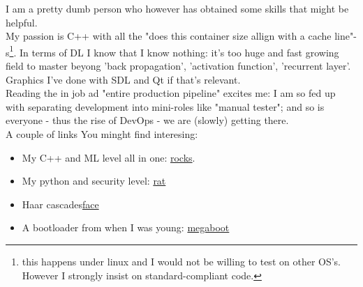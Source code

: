 \documentclass{article}
\begin{document}
I am a pretty dumb person who however has obtained some skills that might be helpful.  \\

My passion is C++ with all the "does this container size allign with a cache line"-s\footnote{this happens under linux and I would not be willing to test on other OS's. However I strongly insist on standard-compliant code.}.
In terms of DL I know that I know nothing: it's too huge and fast growing field to master beyong 'back propagation', 'activation function', 'recurrent layer'.
Graphics I've done with SDL and Qt if that's relevant.  \\

Reading the in job ad "entire production pipeline" excites me: I am so fed up with separating development into mini-roles like "manual tester"; and so is everyone - thus the rise of DevOps - we are (slowly) getting there.  \\

A couple of links You minght find interesing:  \\
\begin{itemize}
\item{My C++ and ML level all in one: {\href{https://github.com/MiroslavVitkov/rocks}{rocks}}.}
\item{My python and security level: {\href{https://github.com/MiroslavVitkov/rat}{rat}}}
\item{Haar cascades{\href{https://github.com/MiroslavVitkov/face}{face}}}
\item{A bootloader from when I was young: {\href{https://github.com/MiroslavVitkov/megaboot}{megaboot}}}
\end{itemize}
\end{document}
